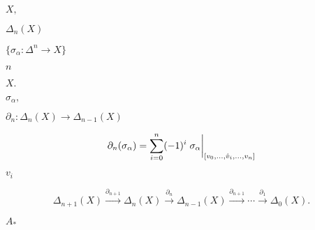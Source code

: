 \documentclass[10pt]{book}
\begin{document}
\begin{mdSnippets}
\begin{mdInlineSnippet}[412bd1def2f1b61da9169d88e6c8b9e9]%
$X,$\end{mdInlineSnippet}%
\begin{mdInlineSnippet}[cb1d7c6a00d98b1e446dcd1eb0201c8f]%
$\Delta_n(X)$\end{mdInlineSnippet}%
\begin{mdInlineSnippet}[89bc1cdfd5759e6ee0c66443646a4e33]%
$\{\sigma_\alpha: \Delta^n \to X\}$\end{mdInlineSnippet}%
\begin{mdInlineSnippet}[7b8b965ad4bca0e41ab51de7b31363a1]%
$n$\end{mdInlineSnippet}%
\begin{mdInlineSnippet}[3d2f9e254afe4be361f104d3748e8570]%
$X.$\end{mdInlineSnippet}%
\begin{mdInlineSnippet}%
$\sigma_\alpha,$\end{mdInlineSnippet}%
\begin{mdInlineSnippet}%
$\partial_n: \Delta_n(X) \to \Delta_{n-1}(X)$\end{mdInlineSnippet}%
\begin{mdDisplaySnippet}%
\[%
\partial_n(\sigma_\alpha) = \sum_{i=0}^n (-1)^i
  \eval{\sigma_\alpha}_{[v_0, \dots, \hat{v}_i, \dots, v_n]}
\]%
\end{mdDisplaySnippet}%
\begin{mdInlineSnippet}%
$v_i$\end{mdInlineSnippet}%
\begin{mdDisplaySnippet}[3c787819aa205237b1ab0247c5e6af9b]%
\[%
\Delta_{n+1}(X) \overset{\partial_{n+1}}{\longrightarrow}
\Delta_{n}(X) \overset{\partial_{n}}{\longrightarrow}
\Delta_{n-1}(X) \overset{\partial_{n+1}}{\longrightarrow}
\cdots \overset{\partial_{1}}{\longrightarrow} \Delta_0(X).
\]%
\end{mdDisplaySnippet}%
\begin{mdInlineSnippet}[bfb8158d29b977d384fd028bb66c6290]%
$A_*$\end{mdInlineSnippet}%

\end{mdSnippets}
\end{document}
